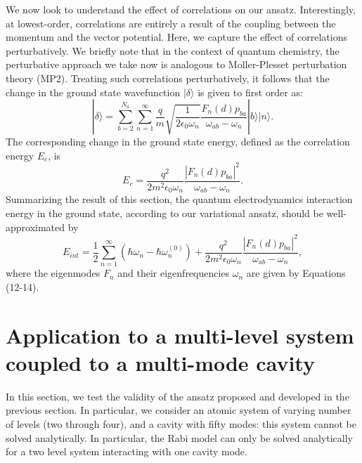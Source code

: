 \documentclass[aps,prb,twocolumn,
	groupedaddress,superscriptaddress,
	amsfonts,amssymb,amsmath,floatfix,
	citeautoscript]{revtex4-1}
\begin{document}
We now look to understand the effect of correlations on our ansatz. Interestingly, at lowest-order, correlations are entirely a result of the coupling between the momentum and the vector potential. Here, we capture the effect of correlations perturbatively. We briefly note that in the context of quantum chemistry, the perturbative approach we take now is analogous to Moller-Plesset perturbation theory (MP2). Treating such correlations perturbatively, it follows that the change in the ground state wavefunction $|\delta\rangle$ is given to first order as:
\begin{equation}\label{eq:MP2wavefunction}
|\delta\rangle = \sum\limits_{b = 2}^{N_a}\sum\limits_{n=1}^{\infty} \frac{q}{m}\sqrt{\frac{1}{2\epsilon_0\omega_n}}\frac{F_n(d)p_{ba}}{\omega_{ab}-\omega_n}|b\rangle|n\rangle.
\end{equation}
The corresponding change in the ground state energy, defined as the correlation energy $E_c$, is
\begin{equation}\label{eq:MP2energy}
E_{c} = \frac{q^2}{2m^2\epsilon_0\omega_n}\frac{|F_n(d)p_{ba}|^2}{\omega_{ab}-\omega_n}.
\end{equation}
Summarizing the result of this section, the quantum electrodynamics interaction energy in the ground state, according to our variational ansatz, should be well-approximated by
\begin{equation}\label{eq:total_interaction_energy}
E_{int} = \frac{1}{2}\sum\limits_{n=1}^{\infty}\left(\hbar\omega_n - \hbar\omega_n^{(0)} \right) + \frac{q^2}{2m^2\epsilon_0\omega_n}\frac{|F_n(d)p_{ba}|^2}{\omega_{ab}-\omega_n},
\end{equation}
where the eigenmodes $F_n$ and their eigenfrequencies $\omega_n$ are given by Equations (12-14).

\section{Application to a multi-level system coupled to a multi-mode cavity}
\label{sec:multi-level}

In this section, we test the validity of the ansatz proposed and developed in the previous section. In particular, we consider an atomic system of varying number of levels (two through four), and a cavity with fifty modes: this system cannot be solved analytically. In particular, the Rabi model can only be solved analytically for a two level system interacting with one cavity mode. 
\end{document}
